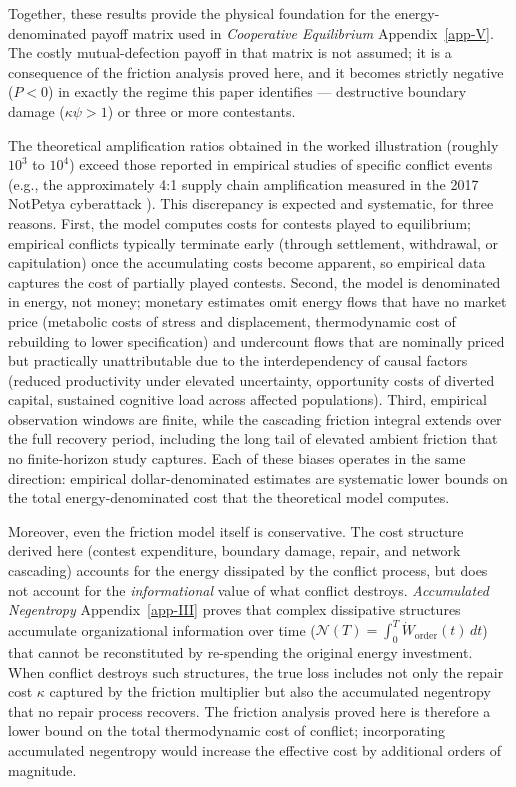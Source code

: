 \documentclass[11pt]{article}
\theoremstyle{plain}
\theoremstyle{definition}
\theoremstyle{remark}
\begin{document}
Together, these results provide the physical foundation for the
energy-denominated payoff matrix used in \emph{Cooperative Equilibrium}
Appendix~\ref{app-V}. The costly mutual-defection payoff in that matrix
is not assumed; it is a consequence of the friction analysis proved
here, and it becomes strictly negative (\(P < 0\)) in exactly the regime
this paper identifies --- destructive boundary damage
(\(\kappa\psi > 1\)) or three or more contestants.

The theoretical amplification ratios obtained in the worked illustration
(roughly \(10^3\) to \(10^4\)) exceed those reported in empirical
studies of specific conflict events (e.g., the approximately 4:1 supply
chain amplification measured in the 2017 NotPetya cyberattack
\citep{Crosignani2023}). This discrepancy is expected and systematic,
for three reasons. First, the model computes costs for contests played
to equilibrium; empirical conflicts typically terminate early (through
settlement, withdrawal, or capitulation) once the accumulating costs
become apparent, so empirical data captures the cost of partially played
contests. Second, the model is denominated in energy, not money;
monetary estimates omit energy flows that have no market price
(metabolic costs of stress and displacement, thermodynamic cost of
rebuilding to lower specification) and undercount flows that are
nominally priced but practically unattributable due to the
interdependency of causal factors (reduced productivity under elevated
uncertainty, opportunity costs of diverted capital, sustained cognitive
load across affected populations). Third, empirical observation windows
are finite, while the cascading friction integral extends over the full
recovery period, including the long tail of elevated ambient friction
that no finite-horizon study captures. Each of these biases operates in
the same direction: empirical dollar-denominated estimates are
systematic lower bounds on the total energy-denominated cost that the
theoretical model computes.

Moreover, even the friction model itself is conservative. The cost
structure derived here (contest expenditure, boundary damage, repair,
and network cascading) accounts for the energy dissipated by the
conflict process, but does not account for the \emph{informational}
value of what conflict destroys. \emph{Accumulated Negentropy}
Appendix~\ref{app-III} proves that complex dissipative structures
accumulate organizational information over time
(\(\mathcal{N}(T) = \int_0^T \dot{W}_{\text{order}}(t)\,dt\)) that
cannot be reconstituted by re-spending the original energy investment.
When conflict destroys such structures, the true loss includes not only
the repair cost \(\kappa\) captured by the friction multiplier but also
the accumulated negentropy that no repair process recovers. The friction
analysis proved here is therefore a lower bound on the total
thermodynamic cost of conflict; incorporating accumulated negentropy
would increase the effective cost by additional orders of magnitude.
\end{document}
